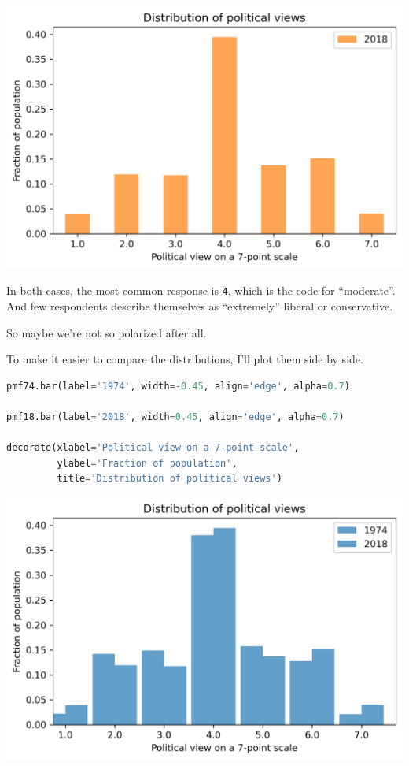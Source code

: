 \begin{center}
\includegraphics[scale=0.75]{02_polviews_files/02_polviews_32_0.png}
\end{center}

In both cases, the most common response is \passthrough{\lstinline!4!},
which is the code for ``moderate''. And few respondents describe
themselves as ``extremely'' liberal or conservative.

So maybe we're not so polarized after all.

To make it easier to compare the distributions, I'll plot them side by
side.

\begin{lstlisting}[language=Python,style=source]
pmf74.bar(label='1974', width=-0.45, align='edge', alpha=0.7)

pmf18.bar(label='2018', width=0.45, align='edge', alpha=0.7)

decorate(xlabel='Political view on a 7-point scale',
         ylabel='Fraction of population',
         title='Distribution of political views')
\end{lstlisting}

\begin{center}
\includegraphics[scale=0.75]{02_polviews_files/02_polviews_34_0.png}
\end{center}

